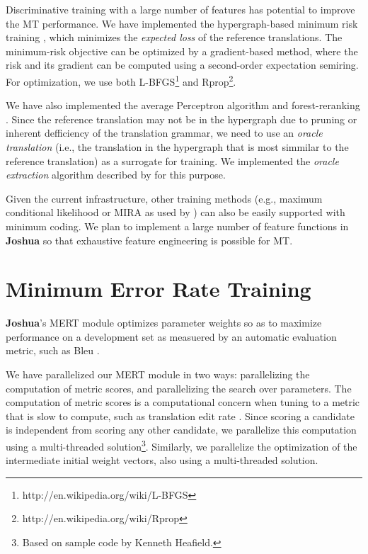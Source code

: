 \documentclass[11pt]{article}
\newcommand{\joshua}{\textbf{Joshua}\xspace}
\begin{document}
Discriminative training with a large number of features has 
potential to improve the MT performance.
We have implemented the hypergraph-based minimum risk training \cite{li-eisner:2009:EMNLP},
which minimizes the {\em expected loss} of the reference translations.
The minimum-risk objective can be optimized by a gradient-based method, where
the risk and its gradient can be computed using a second-order expectation semiring.
For optimization, we use both L-BFGS\footnote{http://en.wikipedia.org/wiki/L-BFGS} 
and Rprop\footnote{http://en.wikipedia.org/wiki/Rprop}.

We have also implemented the average Perceptron algorithm and forest-reranking \cite{zhifei-forest-reranking-galebook}.
Since the reference translation may not be in the hypergraph due to pruning or inherent
defficiency of the translation grammar, we need to use an {\em oracle translation} (i.e., the translation in
the hypergraph that is most simmilar to the reference translation) as a surrogate for training.
We implemented the {\em oracle extraction} algorithm described by 
for this purpose.

Given the current infrastructure, other training methods 
(e.g., maximum conditional likelihood or MIRA as used by )
can also be easily supported with minimum coding.
We plan to implement a large number of feature functions in \joshua so that exhaustive 
feature engineering is possible for MT.


\section{Minimum Error Rate Training}

\joshua's MERT module optimizes parameter weights so as to maximize performance
on a development set as measuered by an automatic evaluation metric, such as
Bleu \cite{och-mert}.

We have parallelized our MERT module in two ways: parallelizing the computation
of metric scores, and parallelizing the search over parameters. The computation
of metric scores is a computational concern when tuning to a metric that is
slow to compute, such as translation edit rate \cite{snover-etal:2006:ter}.
Since scoring a candidate is independent from scoring any other candidate, we
parallelize this computation using a multi-threaded solution\footnote{Based on
sample code by Kenneth Heafield.}. Similarly, we parallelize the optimization
of the intermediate initial weight vectors, also using a multi-threaded
solution.
\end{document}
